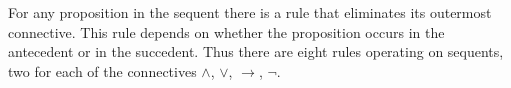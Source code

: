 

\setcounter{section}{2}
\setcounter{subsection}{4}
\setcounter{dfn}{6}


For any proposition in the sequent there is a rule that eliminates its outermost connective.
This rule depends on whether the proposition occurs in the antecedent or in the succedent.
Thus there are eight rules operating on sequents, two for each of the connectives $\wedge$, $\vee$, $\to$, $\neg$.



